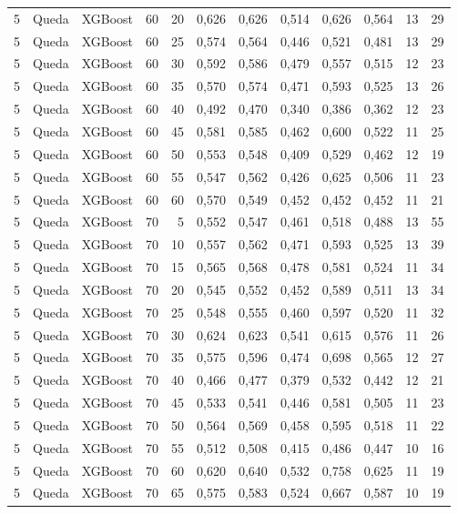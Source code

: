 \begin{longtable}{@{}rllrrrrrrrrr@{}}
5 & Queda & XGBoost & 60 & 20 & 0,626 & 0,626 & 0,514 & 0,626 & 0,564 & 13 & 29 \\
5 & Queda & XGBoost & 60 & 25 & 0,574 & 0,564 & 0,446 & 0,521 & 0,481 & 13 & 29 \\
5 & Queda & XGBoost & 60 & 30 & 0,592 & 0,586 & 0,479 & 0,557 & 0,515 & 12 & 23 \\
5 & Queda & XGBoost & 60 & 35 & 0,570 & 0,574 & 0,471 & 0,593 & 0,525 & 13 & 26 \\
5 & Queda & XGBoost & 60 & 40 & 0,492 & 0,470 & 0,340 & 0,386 & 0,362 & 12 & 23 \\
5 & Queda & XGBoost & 60 & 45 & 0,581 & 0,585 & 0,462 & 0,600 & 0,522 & 11 & 25 \\
5 & Queda & XGBoost & 60 & 50 & 0,553 & 0,548 & 0,409 & 0,529 & 0,462 & 12 & 19 \\
5 & Queda & XGBoost & 60 & 55 & 0,547 & 0,562 & 0,426 & 0,625 & 0,506 & 11 & 23 \\
5 & Queda & XGBoost & 60 & 60 & 0,570 & 0,549 & 0,452 & 0,452 & 0,452 & 11 & 21 \\
5 & Queda & XGBoost & 70 & 5 & 0,552 & 0,547 & 0,461 & 0,518 & 0,488 & 13 & 55 \\
5 & Queda & XGBoost & 70 & 10 & 0,557 & 0,562 & 0,471 & 0,593 & 0,525 & 13 & 39 \\
5 & Queda & XGBoost & 70 & 15 & 0,565 & 0,568 & 0,478 & 0,581 & 0,524 & 11 & 34 \\
5 & Queda & XGBoost & 70 & 20 & 0,545 & 0,552 & 0,452 & 0,589 & 0,511 & 13 & 34 \\
5 & Queda & XGBoost & 70 & 25 & 0,548 & 0,555 & 0,460 & 0,597 & 0,520 & 11 & 32 \\
5 & Queda & XGBoost & 70 & 30 & 0,624 & 0,623 & 0,541 & 0,615 & 0,576 & 11 & 26 \\
5 & Queda & XGBoost & 70 & 35 & 0,575 & 0,596 & 0,474 & 0,698 & 0,565 & 12 & 27 \\
5 & Queda & XGBoost & 70 & 40 & 0,466 & 0,477 & 0,379 & 0,532 & 0,442 & 12 & 21 \\
5 & Queda & XGBoost & 70 & 45 & 0,533 & 0,541 & 0,446 & 0,581 & 0,505 & 11 & 23 \\
5 & Queda & XGBoost & 70 & 50 & 0,564 & 0,569 & 0,458 & 0,595 & 0,518 & 11 & 22 \\
5 & Queda & XGBoost & 70 & 55 & 0,512 & 0,508 & 0,415 & 0,486 & 0,447 & 10 & 16 \\
5 & Queda & XGBoost & 70 & 60 & 0,620 & 0,640 & 0,532 & 0,758 & 0,625 & 11 & 19 \\
5 & Queda & XGBoost & 70 & 65 & 0,575 & 0,583 & 0,524 & 0,667 & 0,587 & 10 & 19 \\

\end{longtable}
